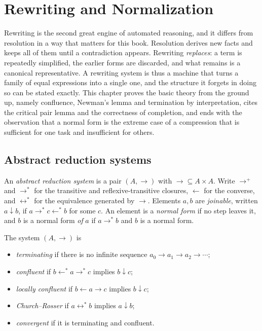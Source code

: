 \chapter{Rewriting and Normalization}
\label{ch:rewriting}

Rewriting is the second great engine of automated reasoning, and it differs from resolution in a way that matters for this book. Resolution derives new facts and keeps all of them until a contradiction appears. Rewriting \emph{replaces}: a term is repeatedly simplified, the earlier forms are discarded, and what remains is a canonical representative. A rewriting system is thus a machine that turns a family of equal expressions into a single one, and the structure it forgets in doing so can be stated exactly. This chapter proves the basic theory from the ground up, namely confluence, Newman's lemma and termination by interpretation, cites the critical pair lemma and the correctness of completion, and ends with the observation that a normal form is the extreme case of a compression that is sufficient for one task and insufficient for others.

\section{Abstract reduction systems}
\label{sec:ars}

An \emph{abstract reduction system} is a pair $(A,\to)$ with ${\to}\subseteq A\times A$. Write $\to^{+}$ and $\to^{*}$ for the transitive and reflexive-transitive closures, $\leftarrow$ for the converse, and $\leftrightarrow^{*}$ for the equivalence generated by $\to$. Elements $a,b$ are \emph{joinable}, written $a\downarrow b$, if $a\to^{*}c\leftarrow^{*}b$ for some $c$. An element is a \emph{normal form} if no step leaves it, and $b$ is a normal form \emph{of} $a$ if $a\to^{*}b$ and $b$ is a normal form.

\begin{definition}
\label{def:conf}
The system $(A,\to)$ is
\begin{itemize}[nosep]
\item \emph{terminating} if there is no infinite sequence $a_0\to a_1\to a_2\to\cdots$;
\item \emph{confluent} if $b\leftarrow^{*}a\to^{*}c$ implies $b\downarrow c$;
\item \emph{locally confluent} if $b\leftarrow a\to c$ implies $b\downarrow c$;
\item \emph{Church--Rosser} if $a\leftrightarrow^{*}b$ implies $a\downarrow b$;
\item \emph{convergent} if it is terminating and confluent.
\end{itemize}
\end{definition}

